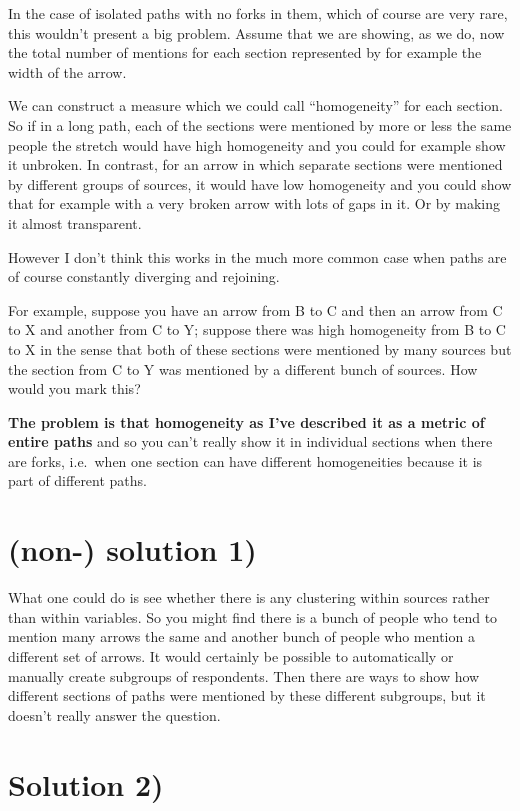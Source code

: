 \documentclass[
]{book}
\begin{document}
In the case of isolated paths with no forks in them, which of course are very rare, this wouldn't present a big problem. Assume that we are showing, as we do, now the total number of mentions for each section represented by for example the width of the arrow.

We can construct a measure which we could call ``homogeneity'' for each section. So if in a long path, each of the sections were mentioned by more or less the same people the stretch would have high homogeneity and you could for example show it unbroken. In contrast, for an arrow in which separate sections were mentioned by different groups of sources, it would have low homogeneity and you could show that for example with a very broken arrow with lots of gaps in it. Or by making it almost transparent.

However I don't think this works in the much more common case when paths are of course constantly diverging and rejoining.

For example, suppose you have an arrow from B to C and then an arrow from C to X and another from C to Y; suppose there was high homogeneity from B to C to X in the sense that both of these sections were mentioned by many sources but the section from C to Y was mentioned by a different bunch of sources. How would you mark this?

\textbf{The problem is that homogeneity as I've described it as a metric of entire paths} and so you can't really show it in individual sections when there are forks, i.e.~when one section can have different homogeneities because it is part of different paths.

\hypertarget{non--solution-1}{%
\section{(non-) solution 1)}\label{non--solution-1}}

What one could do is see whether there is any clustering within sources rather than within variables. So you might find there is a bunch of people who tend to mention many arrows the same and another bunch of people who mention a different set of arrows. It would certainly be possible to automatically or manually create subgroups of respondents. Then there are ways to show how different sections of paths were mentioned by these different subgroups, but it doesn't really answer the question.

\hypertarget{solution-2}{%
\section{Solution 2)}\label{solution-2}}
\end{document}
